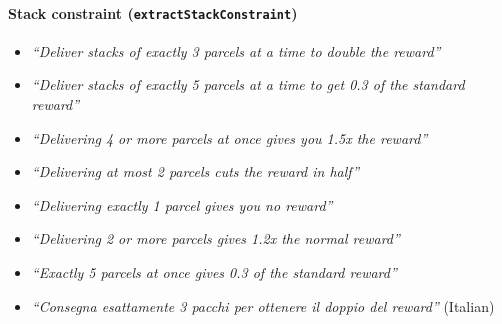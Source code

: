 \paragraph{Stack constraint (\texttt{extractStackConstraint})}
\begin{itemize}
  \item \textit{``Deliver stacks of exactly 3 parcels at a time to double the reward''}
  \item \textit{``Deliver stacks of exactly 5 parcels at a time to get 0.3 of the standard reward''}
  \item \textit{``Delivering 4 or more parcels at once gives you 1.5x the reward''}
  \item \textit{``Delivering at most 2 parcels cuts the reward in half''}
  \item \textit{``Delivering exactly 1 parcel gives you no reward''}
  \item \textit{``Delivering 2 or more parcels gives 1.2x the normal reward''}
  \item \textit{``Exactly 5 parcels at once gives 0.3 of the standard reward''}
  \item \textit{``Consegna esattamente 3 pacchi per ottenere il doppio del reward''} \quad (Italian)
\end{itemize}

